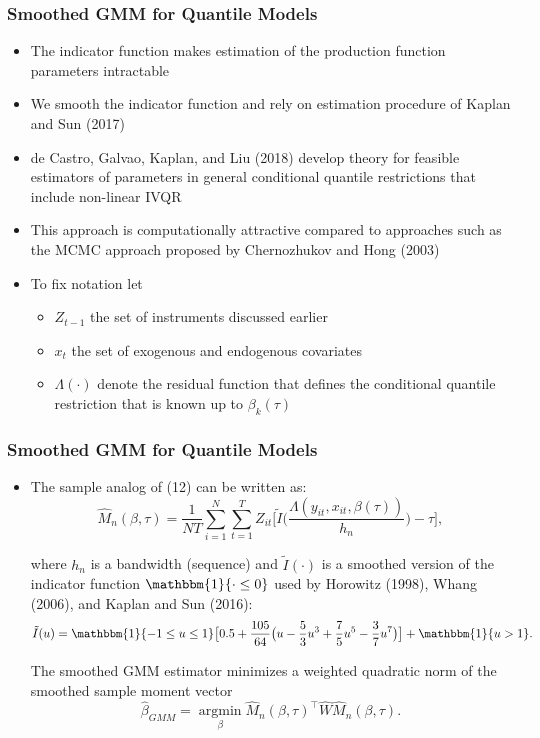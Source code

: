 \documentclass{beamer}
\begin{document}
\begin{frame}
\frametitle{Smoothed GMM for Quantile Models}
\begin{itemize}
	\item The indicator function makes estimation of the production function parameters intractable
	\item We smooth the indicator function and rely on estimation procedure of Kaplan and Sun (2017)
	\item de Castro, Galvao, Kaplan, and Liu (2018) develop theory for feasible estimators of parameters in general conditional quantile restrictions that include non-linear IVQR
	\item This approach is computationally attractive compared to approaches such as the MCMC approach proposed by Chernozhukov and Hong (2003)
	
	\item To fix notation let
	\begin{itemize}
		\item $Z_{t-1}$ the set of instruments discussed earlier
		\item $x_{t}$ the set of exogenous and endogenous covariates
		\item $\Lambda(\cdot)$ denote the residual function that defines the conditional quantile restriction that is known up to $\beta_{k}(\tau)$
	\end{itemize}
	
\end{itemize}
\end{frame}

\begin{frame}
\frametitle{Smoothed GMM for Quantile Models}
\begin{itemize}
	\item The sample analog of (12) can be written as:
	\begin{equation}
    \hat{M}_{n}(\beta, \tau)=\frac{1}{NT}\sum_{i=1}^{N}\sum_{t=1}^{T}Z_{it}\Bigg[\tilde{I}\Bigg(\frac{\Lambda(y_{it}, x_{it}, \beta(\tau))}{h_{n}}\Bigg)-\tau\Bigg],
	\end{equation}
	
	where $h_{n}$ is a bandwidth (sequence) and $\tilde{I}(\cdot)$ is a smoothed version of the indicator function $\mathbbm{1}\{\cdot \leq 0\}$ used by Horowitz (1998), Whang (2006), and Kaplan and Sun (2016):
	\begin{equation}
	    \tilde{I}(u)=\mathbbm{1}\{-1\leq u \leq 1\}\big[0.5+\frac{105}{64}\big(u-\frac{5}{3}u^{3}+\frac{7}{5}u^{5}- \frac{3}{7}u^{7}\big)\big]+\mathbbm{1}\{u>1\}.
	\end{equation}
	
	The smoothed GMM estimator minimizes a weighted quadratic norm of the smoothed sample moment vector
	\begin{equation}
		\hat{\beta}_{GMM}=\underset{\beta}{\operatorname{argmin}}\hat{M}_{n}(\beta, \tau)^{\top}\hat{W}\hat{M}_{n}(\beta, \tau).
		\end{equation}
\end{itemize}
\end{frame}
\end{document}

